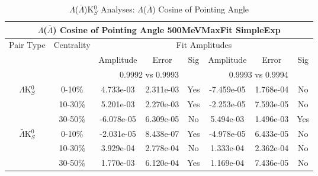 \documentclass[../AnalysisNoteJBuxton.tex]{subfiles}
\begin{document}
\begin{table}
 \centering
 \begin{tabular}{|c|c|c|c|c||c|c|c|}
  \multicolumn{8}{c}{$\Lambda$($\bar{\Lambda}$) Cosine of Pointing Angle 500MeVMaxFit SimpleExp} \\
  \hline
  \multirow{3}{*}{Pair Type} & \multirow{3}{*}{Centrality} & \multicolumn{6}{c|}{Fit Amplitudes} \\
  \cline{3-8}
   & & Amplitude & Error & Sig & Amplitude & Error & Sig \\  
  \cline{3-8}
   & & \multicolumn{3}{c||}{0.9992 vs 0.9993} & \multicolumn{3}{c|}{0.9993 vs 0.9994} \\  
  \hline  
  \multirow{3}{*}{$\Lambda$K$^{0}_{S}$}  
   &  0-10\% & 4.733e-03 & 2.311e-03 & Yes & -7.459e-05 & 1.768e-04 & No \\
   & 10-30\% & 5.201e-03 & 2.270e-03 & Yes & -2.253e-05 & 7.593e-05 & No \\
   & 30-50\% & -6.078e-05 & 6.309e-05 & No & 5.494e-03 & 1.496e-03 & Yes \\
  \hline  
  \multirow{3}{*}{$\bar{\Lambda}$K$^{0}_{S}$}  
   &  0-10\% & -2.031e-05 & 8.438e-07 & Yes & -4.978e-05 & 6.433e-05 & No \\
   & 10-30\% & 3.929e-04 & 2.778e-04 & No & 1.333e-04 & 2.362e-04 & No \\
   & 30-50\% & 1.770e-03 & 6.120e-04 & Yes & 1.169e-04 & 7.436e-05 & No \\
  \hline
 \end{tabular}
 \caption{$\Lambda$($\bar{\Lambda}$)K$^{0}_{S}$ Analyses: $\Lambda$($\bar{\Lambda}$) Cosine of Pointing Angle}
 \label{tab:LamCosPointingAngleLamK0_500MeVMaxFit_SimpleExp}
\end{table}


\clearpage
\end{document}
